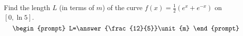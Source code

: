 \documentclass{ximera}
\author{Gregory Hartman \and Matthew Carr}
\begin{document}
\begin{exercise}





Find the length $L$ (in terms of $\unit{m}$) of the curve $f(x)=\frac{1}{2}\left(e^x+e^{-x}\right)$ on $[0,\ln 5]$. 
\[
\begin{prompt}
L=\answer{\frac{12}{5}}\unit{m}
\end{prompt}
\]




\end{exercise}
\end{document}
